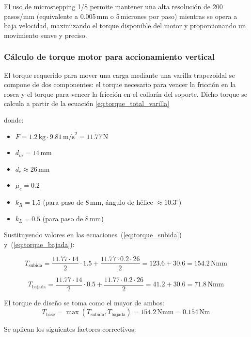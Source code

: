 El uso de microstepping 1/8 permite mantener una alta resolución de 200\,pasos/mm (equivalente a 0.005\,mm o 5\,micrones por paso) mientras se opera a baja velocidad, maximizando el torque disponible del motor y proporcionando un movimiento suave y preciso.\\
\subsubsection{Cálculo de torque motor para accionamiento vertical}

El torque requerido para mover una carga mediante una varilla trapezoidal se compone de dos componentes: el torque necesario para vencer la fricción en la rosca y el torque para vencer la fricción en el collarín del soporte. Dicho torque se calcula a partir de la ecuación \ref{eq:torque_total_varilla}

donde:
\begin{itemize}[label=$\bullet$]
    \item $F = 1.2\,\text{kg} \cdot 9.81\,\text{m/s}^2 = 11.77$\,N
    \item $d_m = 14$\,mm
    \item $d_c \approx 26$\,mm
    \item $\mu_c = 0.2$
    \item $k_R = 1.5$ (para paso de 8\,mm, ángulo de hélice $\approx 10.3^\circ$)
    \item $k_L = 0.5$ (para paso de 8\,mm)
\end{itemize}

Sustituyendo valores en las ecuaciones~(\ref{eq:torque_subida}) y~(\ref{eq:torque_bajada}):

\[T_{\text{subida}} = \frac{11.77 \cdot 14}{2} \cdot 1.5 + \frac{11.77 \cdot 0.2 \cdot 26}{2} = 123.6 + 30.6 = 154.2\,\text{Nmm}\]

\[T_{\text{bajada}} = \frac{11.77 \cdot 14}{2} \cdot 0.5 + \frac{11.77 \cdot 0.2 \cdot 26}{2} = 41.2 + 30.6 = 71.8\,\text{Nmm}\]

El torque de diseño se toma como el mayor de ambos:
\[T_{\text{base}} = \max(T_{\text{subida}}, T_{\text{bajada}}) = 154.2\,\text{Nmm} = 0.154\,\text{Nm}\]

Se aplican los siguientes factores correctivos:


